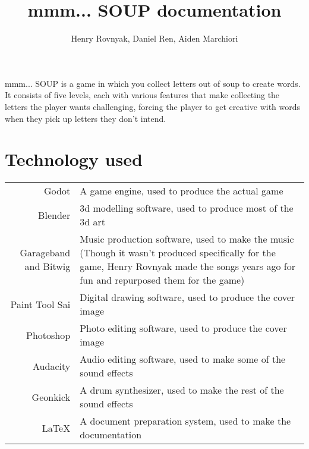\documentclass{article}
\title{mmm... SOUP documentation}
\author{Henry Rovnyak, Daniel Ren, Aiden Marchiori}
\begin{document}
	\maketitle
	
	mmm... SOUP is a game in which you collect letters out of soup to create words. It consists of five levels, each with various features that make collecting the letters the player wants challenging, forcing the player to get creative with words when they pick up letters they don't intend. 
	
	\section{Technology used}
	\begin{tabular}{r p{7cm}}
	Godot & A game engine, used to produce the actual game\\
	Blender & 3d modelling software, used to produce most of the 3d art\\
	Garageband and Bitwig & Music production software, used to make the music (Though it wasn't produced specifically for the game, Henry Rovnyak made the songs years ago for fun and repurposed them for the game)\\
	Paint Tool Sai & Digital drawing software, used to produce the cover image\\
	Photoshop & Photo editing software, used to produce the cover image\\
	Audacity & Audio editing software, used to make some of the sound effects\\
	Geonkick & A drum synthesizer, used to make the rest of the sound effects\\
	\LaTeX & A document preparation system, used to make the documentation\\
	\end{tabular}
	
\end{document}
